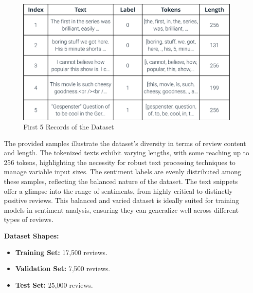 \documentclass{article}
\begin{document}
\begin{figure}[H]
    \centering
    \includegraphics[width=\textwidth]{figs/head5imdb.png}
    \caption{First 5 Records of the Dataset}
    \label{fig:head5imdb}
\end{figure}
The provided samples illustrate the dataset's diversity in terms of review content and length. The tokenized texts exhibit varying lengths, with some reaching up to 256 tokens, highlighting the necessity for robust text processing techniques to manage variable input sizes. The sentiment labels are evenly distributed among these samples, reflecting the balanced nature of the dataset. The text snippets offer a glimpse into the range of sentiments, from highly critical to distinctly positive reviews. This balanced and varied dataset is ideally suited for training models in sentiment analysis, ensuring they can generalize well across different types of reviews.

\textbf{Dataset Shapes:}
\begin{itemize}
    \item \textbf{Training Set:} 17,500 reviews.
    \item \textbf{Validation Set:} 7,500 reviews.
    \item \textbf{Test Set:} 25,000 reviews. 
\end{itemize}
\end{document}
